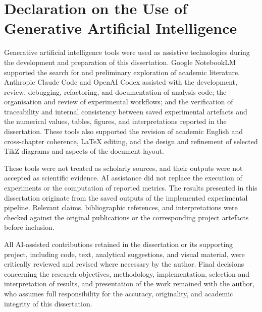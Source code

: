 
\chapter*{Declaration on the Use of Generative Artificial Intelligence}

Generative artificial intelligence tools were used as assistive technologies during the development and preparation of this dissertation. Google NotebookLM supported the search for and preliminary exploration of academic literature. Anthropic Claude Code and OpenAI Codex assisted with the development, review, debugging, refactoring, and documentation of analysis code; the organisation and review of experimental workflows; and the verification of traceability and internal consistency between saved experimental artefacts and the numerical values, tables, figures, and interpretations reported in the dissertation. These tools also supported the revision of academic English and cross-chapter coherence, LaTeX editing, and the design and refinement of selected TikZ diagrams and aspects of the document layout.

These tools were not treated as scholarly sources, and their outputs were not accepted as scientific evidence. AI assistance did not replace the execution of experiments or the computation of reported metrics. The results presented in this dissertation originate from the saved outputs of the implemented experimental pipeline. Relevant claims, bibliographic references, and interpretations were checked against the original publications or the corresponding project artefacts before inclusion.

All AI-assisted contributions retained in the dissertation or its supporting project, including code, text, analytical suggestions, and visual material, were critically reviewed and revised where necessary by the author. Final decisions concerning the research objectives, methodology, implementation, selection and interpretation of results, and presentation of the work remained with the author, who assumes full responsibility for the accuracy, originality, and academic integrity of this dissertation.
